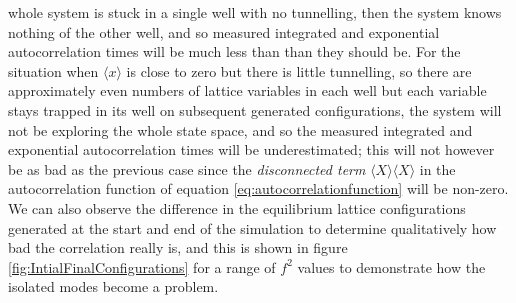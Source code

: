 \documentclass[12pt]{article}
\begin{document}
whole system is stuck in a single well with no tunnelling, then the system knows nothing of the other well, and so measured integrated and exponential autocorrelation times will be much less than than they should be. For the situation when $\langle x \rangle$ is close to zero but there is little tunnelling, so there are approximately even numbers of lattice variables in each well but each variable stays trapped in its well on subsequent generated configurations, the system will not be exploring the whole state space, and so the measured integrated and exponential autocorrelation times will be underestimated; this will not however be as bad as the previous case since the \textit{disconnected term} $\langle X\rangle\langle X\rangle$ in the autocorrelation function of equation \ref{eq:autocorrelationfunction} will be non-zero.  We can also observe the difference in the equilibrium lattice configurations generated at the start and end of the simulation to determine qualitatively how bad the correlation really is, and this is shown in figure \ref{fig:IntialFinalConfigurations} for a range of $f^2$ values to demonstrate how the isolated modes become a problem.
\end{document}
